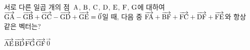 서로 다른 일곱 개의 점~$\mathrm{A}$, $\mathrm{B}$, $\mathrm{C}$, $\mathrm{D}$, $\mathrm{E}$, $\mathrm{F}$, $\mathrm{G}$에 대하여 $\overrightarrow{\mathrm{GA}}-\overrightarrow{\mathrm{GB}}+\overrightarrow{\mathrm{GC}}-\overrightarrow{\mathrm{GD}}+\overrightarrow{\mathrm{GE}}=\vec{0}$일 때, 다음 중 $\overrightarrow{\mathrm{FA}}+\overrightarrow{\mathrm{BF}}+\overrightarrow{\mathrm{FC}}+\overrightarrow{\mathrm{DF}}+\overrightarrow{\mathrm{FE}}$와 항상 같은 벡터는?
\begin{choices32}{$\overrightarrow{\mathrm{AE}}$}{$\overrightarrow{\mathrm{BD}}$}{$\overrightarrow{\mathrm{FG}}$}{$\overrightarrow{\mathrm{GF}}$}{$\vec{0}$}\end{choices32}
